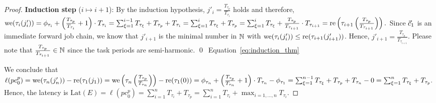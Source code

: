 \documentclass[10pt,conference]{resources/IEEEtran}
\theoremstyle{definition}
\newcommand{\lat}{\mathrm{Lat}}
\newcommand{\fc}{\fw{c}}
\newcommand{\pc}{{pc}}
\begin{document}
\begin{proof}
		\textbf{Induction step} ($i\mapsto i+1$):
		By the induction hypothesis, $j'_i = \frac{T_{\tau_p}}{T_{\tau_i}}$ holds and therefore, 
		\begin{math}
			\operatorname{we}(\tau_i(j'_i)) 
			= \phi_{\tau_i} + \left( \frac{T_{\tau_p}}{T_{\tau_i}} +1 \right)\cdot T_{\tau_i} 
			= \sum_{\xi = 1}^{i-1} T_{\tau_\xi} + T_{\tau_p} + T_{\tau_i}
			= \sum_{\xi = 1}^{i} T_{\tau_\xi} + T_{\tau_p}
			= \sum_{\xi = 1}^{i} T_{\tau_\xi} + \frac{T_{\tau_p}}{T_{\tau_{i+1}}} \cdot T_{\tau_{i+1}}
			= \operatorname{re}\left(\tau_{i+1}\left(\frac{T_{\tau_p}}{T_{\tau_{i+1}}}\right)\right).
		\end{math}
		Since $\fc_1$ is an immediate forward job chain, we know that $j'_{i+1}$ is the minimal number in $\mathbb{N}$ with $\operatorname{we}(\tau_i(j'_{i})) \leq \operatorname{re}(\tau_{i+1}(j'_{i+1}))$.
		Hence, 
		$j'_{i+1} = \frac{T_{\tau_p}}{T_{\tau_{i+1}}}$.
		Please note that $\frac{T_{\tau_p}}{T_{\tau_{i+1}}} \in \mathbb{N}$ since the task periods are semi-harmonic. 
		\qed~Equation~\eqref{eq:induction_thm}

		\smallskip
		We conclude that 
		\begin{math}
			\ell(\pc^p_0) 
			= \we(\tau_n(j'_n)) - \re(\tau_1(j_1)) 
			= \we\left(\tau_n\left(\frac{T_{\tau_p}}{T_{\tau_n}}\right)\right) - \re(\tau_1(0)) 
			= \phi_{\tau_n} + \left(\frac{T_{\tau_p}}{T_{\tau_n}} +1 \right) \cdot T_{\tau_n} - \phi_{\tau_1}
			= \sum_{\xi=1}^{n-1} T_{\tau_\xi} + T_{\tau_p} + T_{\tau_n} - 0
			= \sum_{\xi=1}^{n} T_{\tau_\xi} + T_{\tau_p}.
		\end{math}
		Hence, the latency is 
		$\lat(E) = \ell(\pc^p_0) = \sum_{i=1}^{n} T_{\tau_i} + T_{\tau_p} = \sum_{i=1}^{n} T_{\tau_i} + \max_{i=1, \dots, n} T_{\tau_i}$.
	\end{proof}
\end{document}
